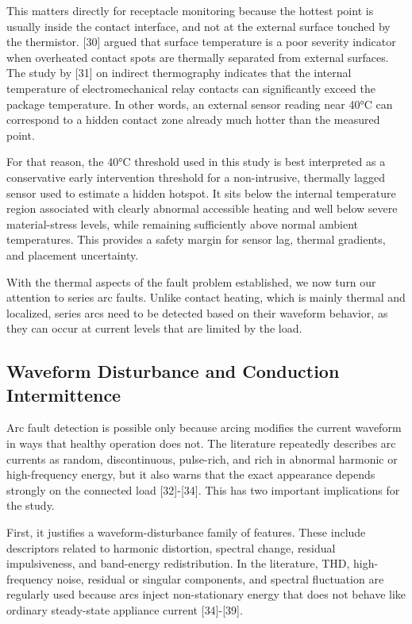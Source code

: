 This matters directly for receptacle monitoring because the hottest
point is usually inside the contact interface, and not at the external
surface touched by the thermistor. {[}30{]} argued that surface
temperature is a poor severity indicator when overheated contact spots
are thermally separated from external surfaces. The study by {[}31{]} on
indirect thermography indicates that the internal temperature of
electromechanical relay contacts can significantly exceed the package
temperature. In other words, an external sensor reading near 40°C can
correspond to a hidden contact zone already much hotter than the
measured point.

For that reason, the 40°C threshold used in this study is best
interpreted as a conservative early intervention threshold for a
non-intrusive, thermally lagged sensor used to estimate a hidden
hotspot. It sits below the internal temperature region associated with
clearly abnormal accessible heating and well below severe
material-stress levels, while remaining sufficiently above normal
ambient temperatures. This provides a safety margin for sensor lag,
thermal gradients, and placement uncertainty.

With the thermal aspects of the fault problem established, we now turn
our attention to series arc faults. Unlike contact heating, which is
mainly thermal and localized, series arcs need to be detected based on
their waveform behavior, as they can occur at current levels that are
limited by the load.

\subsection{Waveform Disturbance and Conduction Intermittence}\label{waveform-disturbance-and-conduction-intermittence}

Arc fault detection is possible only because arcing modifies the current
waveform in ways that healthy operation does not. The literature
repeatedly describes arc currents as random, discontinuous, pulse-rich,
and rich in abnormal harmonic or high-frequency energy, but it also
warns that the exact appearance depends strongly on the connected load
{[}32{]}-{[}34{]}. This has two important implications for the study.

First, it justifies a waveform-disturbance family of features. These
include descriptors related to harmonic distortion, spectral change,
residual impulsiveness, and band-energy redistribution. In the
literature, THD, high-frequency noise, residual or singular components,
and spectral fluctuation are regularly used because arcs inject
non-stationary energy that does not behave like ordinary steady-state
appliance current {[}34{]}-{[}39{]}.

